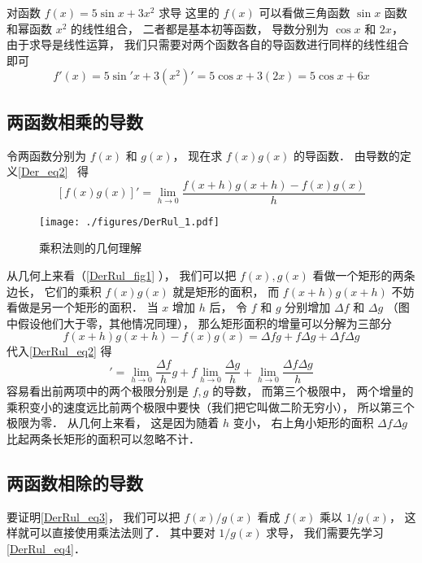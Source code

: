 \begin{example}{对函数 $f(x) = 5\sin x + 3x^2$ 求导}
这里的 $f(x)$ 可以看做三角函数 $\sin x$ 函数和幂函数 $x^2$ 的线性组合， 二者都是基本初等函数， 导数分别为 $\cos x$ 和 $2x$， 由于求导是线性运算， 我们只需要对两个函数各自的导函数进行同样的线性组合即可
\begin{equation}
f'(x) = 5 \sin' x + 3(x^2)' = 5 \cos x + 3(2x) = 5\cos x + 6x
\end{equation}
\end{example}

\subsection{两函数相乘的导数}
令两函数分别为 $f(x)$ 和 $g(x)$， 现在求 $f(x) g(x)$ 的导函数． 由导数的定义\autoref{Der_eq2}~ 得
\begin{equation}\label{DerRul_eq2}
[f(x)g(x)]' = \lim_{h\to 0} \frac{f(x+h)g(x+h) - f(x)g(x)}{h}
\end{equation}

\begin{figure}[ht]
\centering
\texttt{[image: ./figures/DerRul\_1.pdf]}
\caption{乘积法则的几何理解} \label{DerRul_fig1}
\end{figure}

从几何上来看（\autoref{DerRul_fig1} ）， 我们可以把 $f(x), g(x)$ 看做一个矩形的两条边长， 它们的乘积 $f(x)g(x)$ 就是矩形的面积， 而 $f(x+h)g(x+h)$ 不妨看做是另一个矩形的面积． 当 $x$ 增加 $h$ 后， 令 $f$ 和 $g$ 分别增加 $\Delta f$ 和 $\Delta g$ （图中假设他们大于零，其他情况同理）， 那么矩形面积的增量可以分解为三部分
\begin{equation}
f(x+h)g(x+h) - f(x)g(x) = \Delta f g + f \Delta g + \Delta f\Delta g
\end{equation}
代入\autoref{DerRul_eq2} 得
\begin{equation}
[f(x)g(x)]' = \lim_{h\to 0} \frac{\Delta f}{h} g + f \lim_{h\to 0} \frac{\Delta g}{h} + \lim_{h\to 0}\frac{\Delta f\Delta g}{h}
\end{equation}
容易看出前两项中的两个极限分别是 $f,g$ 的导数， 而第三个极限中， 两个增量的乘积变小的速度远比前两个极限中要快（我们把它叫做二阶无穷小）， 所以第三个极限为零． 从几何上来看， 这是因为随着 $h$ 变小， 右上角小矩形的面积 $\Delta f\Delta g$ 比起两条长矩形的面积可以忽略不计．

\subsection{两函数相除的导数}
要证明\autoref{DerRul_eq3}， 我们可以把 $f(x)/g(x)$ 看成 $f(x)$ 乘以 $1/g(x)$， 这样就可以直接使用乘法法则了． 其中要对 $1/g(x)$ 求导， 我们需要先学习\autoref{DerRul_eq4}．
